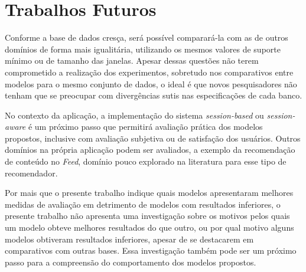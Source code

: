 \section{Trabalhos Futuros}
Conforme a base de dados cresça, será possível comparará-la com as de outros
domínios de forma mais igualitária, utilizando os mesmos valores de suporte
mínimo ou de tamanho das janelas. Apesar dessas questões não terem comprometido
a realização dos experimentos, sobretudo nos comparativos entre modelos para
o mesmo conjunto de dados, o ideal é que novos pesquisadores não tenham que
se preocupar com divergências sutis nas especificações de cada banco.

No contexto da aplicação, a implementação do sistema \textit{session-based} ou
\textit{session-aware} é um próximo passo que permitirá avaliação prática dos
modelos propostos, inclusive com avaliação subjetiva ou de satisfação dos
usuários. Outros domínios na própria aplicação podem ser avaliados, a exemplo da
recomendação de conteúdo no \textit{Feed}, domínio pouco explorado na literatura
para esse tipo de recomendador.

Por mais que o presente trabalho indique quais modelos apresentaram
melhores medidas de avaliação em detrimento de modelos com resultados
inferiores, o presente trabalho não apresenta uma investigação sobre
os motivos pelos quais um modelo obteve melhores resultados do que
outro, ou por qual motivo alguns modelos obtiveram resultados
inferiores, apesar de se destacarem em comparativos com outras bases. Essa
investigação também pode ser um próximo passo para a compreensão do
comportamento dos modelos propostos.